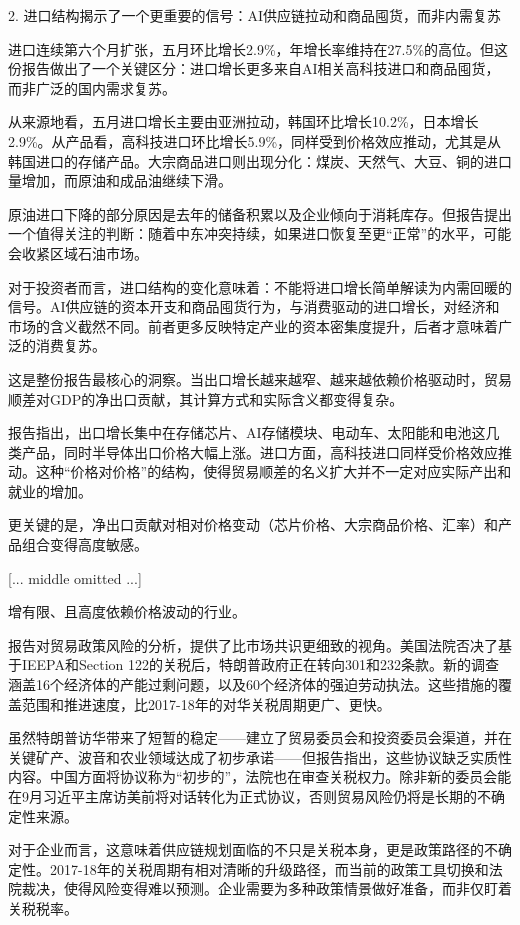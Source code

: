 \documentclass[11pt]{ctexart}
\begin{document}
2. 进口结构揭示了一个更重要的信号：AI供应链拉动和商品囤货，而非内需复苏

进口连续第六个月扩张，五月环比增长2.9\%，年增长率维持在27.5\%的高位。但这份报告做出了一个关键区分：进口增长更多来自AI相关高科技进口和商品囤货，而非广泛的国内需求复苏。

从来源地看，五月进口增长主要由亚洲拉动，韩国环比增长10.2\%，日本增长2.9\%。从产品看，高科技进口环比增长5.9\%，同样受到价格效应推动，尤其是从韩国进口的存储产品。大宗商品进口则出现分化：煤炭、天然气、大豆、铜的进口量增加，而原油和成品油继续下滑。

原油进口下降的部分原因是去年的储备积累以及企业倾向于消耗库存。但报告提出一个值得关注的判断：随着中东冲突持续，如果进口恢复至更“正常”的水平，可能会收紧区域石油市场。

对于投资者而言，进口结构的变化意味着：不能将进口增长简单解读为内需回暖的信号。AI供应链的资本开支和商品囤货行为，与消费驱动的进口增长，对经济和市场的含义截然不同。前者更多反映特定产业的资本密集度提升，后者才意味着广泛的消费复苏。

这是整份报告最核心的洞察。当出口增长越来越窄、越来越依赖价格驱动时，贸易顺差对GDP的净出口贡献，其计算方式和实际含义都变得复杂。

报告指出，出口增长集中在存储芯片、AI存储模块、电动车、太阳能和电池这几类产品，同时半导体出口价格大幅上涨。进口方面，高科技进口同样受价格效应推动。这种“价格对价格”的结构，使得贸易顺差的名义扩大并不一定对应实际产出和就业的增加。

更关键的是，净出口贡献对相对价格变动（芯片价格、大宗商品价格、汇率）和产品组合变得高度敏感。

[... middle omitted ...]

增有限、且高度依赖价格波动的行业。

报告对贸易政策风险的分析，提供了比市场共识更细致的视角。美国法院否决了基于IEEPA和Section 122的关税后，特朗普政府正在转向301和232条款。新的调查涵盖16个经济体的产能过剩问题，以及60个经济体的强迫劳动执法。这些措施的覆盖范围和推进速度，比2017-18年的对华关税周期更广、更快。

虽然特朗普访华带来了短暂的稳定——建立了贸易委员会和投资委员会渠道，并在关键矿产、波音和农业领域达成了初步承诺——但报告指出，这些协议缺乏实质性内容。中国方面将协议称为“初步的”，法院也在审查关税权力。除非新的委员会能在9月习近平主席访美前将对话转化为正式协议，否则贸易风险仍将是长期的不确定性来源。

对于企业而言，这意味着供应链规划面临的不只是关税本身，更是政策路径的不确定性。2017-18年的关税周期有相对清晰的升级路径，而当前的政策工具切换和法院裁决，使得风险变得难以预测。企业需要为多种政策情景做好准备，而非仅盯着关税税率。
\end{document}
